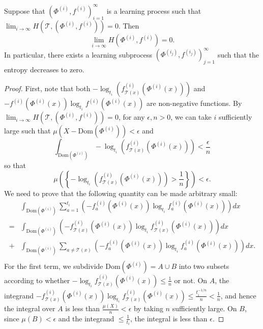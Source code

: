 \documentclass[10pt,a4paper]{amsart}
\newcommand{\cT}{\mathcal{T}}
\begin{document}
\begin{theorem} \label{thm:law_single}
	Suppose that $(\Phi^{(i)},f^{(i)})_{i=1}^\infty$ is a learning process such that $\lim_{i\to\infty} H(\cT,(\Phi^{(i)},f^{(i)})) = 0$. Then 
	$$\lim_{i\to\infty} H(\Phi^{(i)},f^{(i)}) = 0.$$
	In particular, there exists a learning subprocess $(\Phi^{(i_j)},f^{(i_j)})_{j=1}^\infty$ such that the entropy decreases to zero.
\end{theorem}

\begin{proof}
	First, note that both $-\log_{t_i}\left(f^{(i)}_{\cT(x)}(\Phi^{(i)}(x))\right)$ and $-f^{(i)}(\Phi^{(i)}(x)) \log_{t_i} f^{(i)}(\Phi^{(i)}(x))$ are non-negative functions. By $\lim_{i\to\infty} H(\cT,(\Phi^{(i)},f^{(i)})) = 0$, for any $\epsilon, n>0$, we can take $i$ sufficiently large such that $\mu(X-\mathrm{Dom}(\Phi^{(i)})) < \epsilon$ and 
	$$ \int_{\mathrm{Dom}(\Phi^{(i)})} -\log_{t_i} \left(f^{(i)}_{\cT(x)}(\Phi^{(i)}(x))\right) < \frac{\epsilon}{n}$$
	so that $$\mu\left(\left\{-\log_{t_i}\left(f^{(i)}_{\cT(x)}(\Phi^{(i)}(x))\right) > \frac{1}{n}\right\}\right) < \epsilon.$$
	We need to prove that the following quantity can be made arbitrary small:
	\begin{align*}
		& \int_{\mathrm{Dom}(\Phi^{(i)})} \sum_{a=1}^{t_i} \left(-f^{(i)}_a(\Phi^{(i)}(x)) \log_{t_i} f^{(i)}_a(\Phi^{(i)}(x)) \right) dx \\
		=& \int_{\mathrm{Dom}(\Phi^{(i)})} \left(-f^{(i)}_{\cT(x)}(\Phi^{(i)}(x)) \log_{t_i} f^{(i)}_{\cT(x)}(\Phi^{(i)}(x)) \right) dx\\
		+& \int_{\mathrm{Dom}(\Phi^{(i)})} \sum_{a\not=\cT(x)} \left(-f^{(i)}_a(\Phi^{(i)}(x)) \log_{t_i} f^{(i)}_a(\Phi^{(i)}(x)) \right) dx.\\
	\end{align*}
	For the first term, we subdivide $\mathrm{Dom}(\Phi^{(i)}) = A \cup B$ into two subsets according to whether $-\log_{t_i} f^{(i)}_{\cT(x)}(\Phi^{(i)}(x)) \leq \frac{1}{n}$ or not. On $A$, the integrand $-f^{(i)}_{\cT(x)}(\Phi^{(i)}(x)) \log_{t_i} f^{(i)}_{\cT(x)}(\Phi^{(i)}(x)) \leq \frac{t_i^{-1/n}}{n} < \frac{1}{n}$, and hence the integral over $A$ is less than $\frac{\mu(X)}{n} < \epsilon$ by taking $n$ sufficiently large.  On $B$, since $\mu(B) < \epsilon$ and the integrand $\leq \frac{1}{t_i}$, the integral is less than $\epsilon$.
	

\end{proof}
\end{document}
